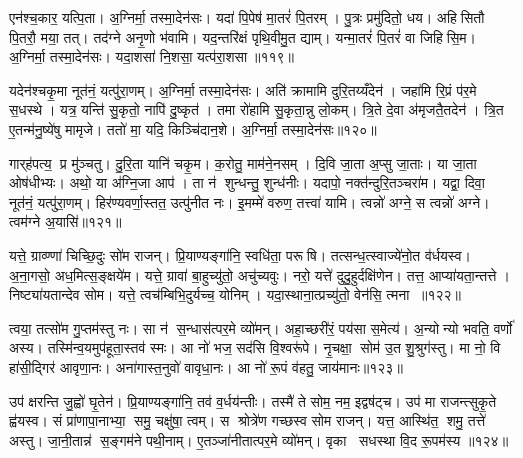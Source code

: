 एन॑श्च॒कार॒ यत्पि॒ता। अ॒ग्निर्मा॒ तस्मा॒देन॑सः। यदा॑ पि॒पेष॑ मा॒तरं॑ पि॒तरम्। पु॒त्रः प्रमु॑दितो॒ धय\sn{}। अहिसितौ पि॒तरौ॒ मया॒ तत्। तद॑ग्ने अनृ॒णो भ॑वामि। यद॒न्तरि॑क्षं पृथि॒वीमु॒त द्याम्। यन्मा॒तरं॑ पि॒तरं॑ वा जिहिसि॒म। अ॒ग्निर्मा॒ तस्मा॒देन॑सः। यदा॒शसा॑ नि॒शसा॒ यत्प॑रा॒शसा॥११९॥

यदेन॑श्चकृ॒मा नूत॑नं॒ यत्पु॑रा॒णम्। अ॒ग्निर्मा॒ तस्मा॒देन॑सः। अति॑ क्रामामि दुरि॒तय्यँदेन॑। जहा॑मि रि॒प्रं प॑र॒मे स॒धस्थे। यत्र॒ यन्ति॑ सु॒कृतो॒ नापि॑ दु॒ष्कृत॑। तमा रो॑हामि सु॒कृता॒न्नु लो॒कम्। त्रि॒ते दे॒वा अ॑मृजतै॒तदेन॑। त्रि॒त ए॒तन्म॑नु॒ष्ये॑षु मामृजे। ततो॑ मा॒ यदि॒ किञ्चि॑दान॒शे। अ॒ग्निर्मा॒ तस्मा॒देन॑सः॥१२०॥

गार्‌ह॑पत्य॒ प्र मु॑ञ्चतु। दु॒रि॒ता यानि॑ चकृ॒म। क॒रोतु॒ माम॑ने॒नसम्। दि॒वि जा॒ता अ॒प्सु जा॒ताः। या जा॒ता ओष॑धीभ्यः। अथो॒ या अ॑ग्नि॒जा आप॑। ता न॑ शुन्धन्तु॒ शुन्ध॑नीः। यदापो॒ नक्त॑न्दुरि॒तञ्चरा॑म। यद्वा॒ दिवा॒ नूत॑नं॒ यत्पु॑रा॒णम्। हिर॑ण्यवर्णा॒स्तत॒ उत्पु॑नीत नः। इ॒मम्मे॑ वरुण॒ तत्त्वा॑ यामि। त्वन्नो॑ अग्ने॒ स त्वन्नो॑ अग्ने। त्वम॑ग्ने अ॒यासि॑॥१२१॥\anuvakamend[अ॒ने॒नस॑मष्ठी॒वद्भ्या स॒ति प॑रा॒शसा॑ऽऽन॒शेऽग्निर्मा॒ तस्मा॒देन॑सः पुनीत न॒स्त्रीणि॑ च (यद्दे॑वा॒ देवा॑ ऋ॒तेन॑ सजातश॒साद्यद्वा॒चा यद्धस्ताभ्या॒मदीव्यं॒ यन्मयि॑ मा॒ता यदा॑ पि॒पेष॒ यद॒न्तरि॑क्षं॒ यदा॒शसाऽति॑ क्रामामि त्रि॒ते दे॒वा दि॒वि जा॒ता अ॒प्सु जा॒ता यदाप॑ इ॒मम्मे॑ वरुण॒ तत्त्वा॑ यामि॒ त्वन्नो॑ अग्ने॒ स त्वन्नो॑ अग्ने॒ त्वम॑ग्ने अ॒यासि॑। )]

यत्ते॒ ग्राव्ण्णा॑ चिच्छि॒दुः सो॑म राजन्। प्रि॒याण्यङ्गा॑नि॒ स्वधि॑ता॒ परूषि। तत्सन्ध॒त्स्वाज्ये॑नो॒त व॑र्धयस्व। अ॒ना॒गसो॒ अध॒मित्स॒ङ्क्षये॑म। यत्ते॒ ग्रावा॑ बा॒हुच्यु॑तो॒ अचु॑च्यवुः। नरो॒ यत्ते॑ दुदु॒हुर्दक्षि॑णेन। तत्त॒ आप्या॑यता॒न्तत्ते। निष्ट्या॑यतान्देव सोम। यत्ते॒ त्वच॑म्बिभि॒दुर्यच्च॒ योनिम्। यदा॒स्थाना॒त्प्रच्यु॑तो॒ वेन॑सि॒ त्मना ॥१२२॥

त्वया॒ तत्सो॑म गु॒प्तम॑स्तु नः। सा न॑ स॒न्धास॑त्पर॒मे व्यो॑मन्। अहा॒च्छरी॑रं॒ पय॑सा स॒मेत्य॑। अ॒न्योन्यो भवति॒ वर्णो॑ अस्य। तस्मि॑न्व॒यमुप॑हूता॒स्तव॑ स्मः। आ नो॑ भज॒ सद॑सि वि॒श्वरू॑पे। नृ॒चक्षा॒ सोम॑ उ॒त शु॒श्रुग॑स्तु। मा नो॒ वि हा॑सी॒द्गिर॑ आवृणा॒नः। अना॑गास्त॒नुवो॑ वावृधा॒नः। आ नो॑ रू॒पं व॑हतु॒ जाय॑मानः॥१२३॥

उप॑ क्षरन्ति जु॒ह्वो॑ घृ॒तेन॑। प्रि॒याण्यङ्गा॑नि॒ तव॑ व॒र्धय॑न्तीः। तस्मै॑ ते सोम॒ नम॒ इद्वष॑ट्च। उप॑ मा राजन्त्सुकृ॒ते ह्व॑यस्व। सं प्रा॑णापा॒नाभ्या॒ समु॒ चक्षु॑षा॒ त्वम्। स श्रोत्रे॑ण गच्छस्व सोम राजन्। यत्त॒ आस्थि॑त॒ शमु॒ तत्ते॑ अस्तु। जा॒नी॒तान्न॑ स॒ङ्गम॑ने पथी॒नाम्। ए॒तञ्जा॑नीतात्पर॒मे व्यो॑मन्। वृका सधस्था वि॒द रू॒पम॑स्य ॥१२४॥

